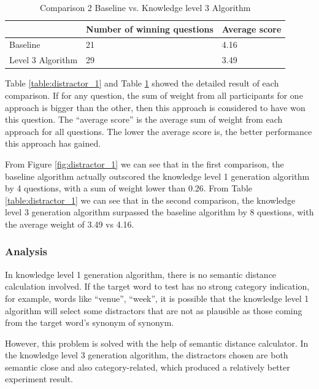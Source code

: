 \begin{table}[ht]
    \caption{Comparison 2 Baseline vs. Knowledge level 3 Algorithm}
    \label{table:distractor_2}
    \begin{center}
    \begin{tabular}{| p{1.5cm} | p{2.5cm} | p{2.2cm} |}
        \hline
         & Number of winning questions & Average score\\
        \hline
        Baseline & 21 & 4.16\\
        \hline
        Level 3 Algorithm & 29 & 3.49\\
        \hline
    \end{tabular}
    \end{center}
\end{table}

Table \ref{table:distractor_1} and Table \ref{table:distractor_2} showed the detailed result of each comparison. If for any question, the sum of weight from all participants for one approach is bigger than the other, then this approach is considered to have won this question. The “average score” is the average sum of weight from each approach for all questions. The lower the average score is, the better performance this approach has gained.

From Figure \ref{fig:distractor_1} we can see that in the first comparison, the baseline algorithm actually outscored the knowledge level 1 generation algorithm by 4 questions, with a sum of weight lower than 0.26. From Table \ref{table:distractor_1} we can see that in the second comparison, the knowledge level 3 generation algorithm surpassed the baseline algorithm by 8 questions, with the average weight of 3.49 vs 4.16. 

\subsubsection{Analysis}
In knowledge level 1 generation algorithm, there is no semantic distance calculation involved. If the target word to test has no strong category indication, for example, words like “venue”, “week”, it is possible that the knowledge level 1 algorithm will select some distractors that are not as plausible as those coming from the target word’s synonym of synonym. 

However, this problem is solved with the help of semantic distance calculator. In the knowledge level 3 generation algorithm, the distractors chosen are both semantic close and also category-related, which produced a relatively better experiment result.

